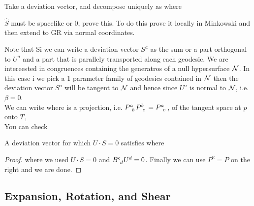 \documentclass{article}
\begin{document}
Take a deviation vector, and decompose uniquely as 
where 
\begin{ex}
$\hat{S}$ must be spacelike or 0, prove this. To do this prove it locally in Minkowski and then extend to GR via normal coordinates. 
\end{ex}

Note that 
Si we can write a deviation vector $S^a$ as the sum or a part 
orthogonal to $U^a$ and a part 
that is parallely transported along each geodesic. We are intereested in congruences containing the generatros of a null hypersurface $\mathcal{N}$. In this case i we pick a 1 parameter family of geodesics contained in $\mathcal{N}$ then the deviation vector $S^a$ will be tangent to $\mathcal{N}$ and hence 
since $U^a$ is normal to $\mathcal{N}$, i.e. $\beta = 0$. \\
We can write 
where
is a projection, i.e. $P\indices{^a_b} P\indices{^b_c} = P\indices{^a_c}$, of the tangent space at $p$ onto $T_\perp$ \\
You can check 

\begin{prop}
A deviation vector for which $U\cdot S = 0$ satisfies 
where 
\end{prop}
\begin{proof}
where we used $U \cdot S = 0 $ and $B\indices{^c_d} U^d = 0$. Finally we can use $P^2 = P$ on the right and we are done. 
\end{proof}

\subsection{Expansion, Rotation, and Shear}
\end{document}
